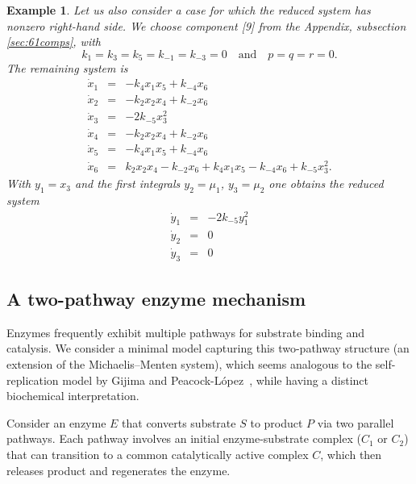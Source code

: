 \documentclass{article}
\newtheorem{example}{Example}
\begin{document}
\begin{example}{\em 
Let us also consider a case for which the reduced system has nonzero right-hand side. We choose component [9] from the Appendix, subsection \ref{sec:61comps}, with
\[
k_1=k_3=k_5=k_{-1}=k_{-3}=0\quad\text{and}\quad p=q=r=0.
\]
The remaining system is
\begin{equation*}\label{replicationsyscut}
\begin{array}{rcl}
\dot x_1 & =&  -k_4x_1x_5 +k_{-4}x_6\\[2pt]
\dot x_2 &= & -k_2x_2x_4 +k_{-2}x_6\\[2pt]
\dot x_3&=&  -2k_{-5}x_3^2 \\[2pt]
\dot x_4&=&  -k_2x_2x_4 +k_{-2}x_6\\[2pt]
\dot x_5&=&-k_4x_1x_5 +k_{-4}x_6  \\[2pt]
\dot x_6&=&k_2x_2x_4 -k_{-2}x_6+k_4x_1x_5 -k_{-4}x_6+k_{-5}x_3^2.
\end{array}
\end{equation*}
With $y_1=x_3$ and the first integrals $y_2=\mu_1$, $y_3=\mu_2$ one obtains the reduced system
\begin{equation*}
    \begin{array}{rcl}
       \dot y_1  & =& -2k_{-5} y_1^2 \\
        \dot y_2 & =&0\\
        \dot y_3&=& 0
    \end{array}
\end{equation*}
}
\end{example}

\subsection{A two-pathway enzyme mechanism}\label{subsec:enzyme}
Enzymes frequently exhibit multiple pathways for substrate binding and catalysis. 
We consider a minimal model capturing this two-pathway structure (an extension of 
the Michaelis--Menten system), which seems analogous to the self-replication model 
by Gijima and Peacock-L\'opez~\cite{GPL2020}, while having a distinct biochemical
interpretation.


Consider an enzyme $E$ that converts substrate $S$ to product $P$ via two 
parallel pathways. Each pathway involves an initial enzyme-substrate 
complex ($C_1$ or $C_2$) that can transition to a common catalytically 
active complex $C$, which then releases product and regenerates the enzyme.
\end{document}
